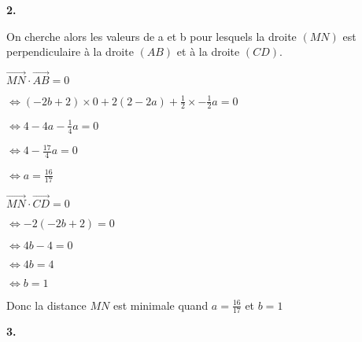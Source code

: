 \documentclass{article}
\begin{document}
\vspace{6mm}

\textbf{2.}

\vspace{2mm}

\noindent On cherche alors les valeurs de a et b pour lesquels la droite $(MN)$ est perpendiculaire à la droite $(AB)$ et à la droite $(CD)$.

\vspace{2mm}

$\overrightarrow{MN} \cdot \overrightarrow{AB} = 0$

\vspace{2mm}

$\Leftrightarrow (-2b+2)\times 0 + 2(2-2a) + \displaystyle\frac{1}{2} \times -\frac{1}{2} a = 0$

\vspace{2mm}

$\Leftrightarrow 4 - 4a - \displaystyle\frac{1}{4} a = 0$

\vspace{2mm}

$\Leftrightarrow 4 - \displaystyle\frac{17}{4}a = 0$

\vspace{2mm}

$\Leftrightarrow a = \displaystyle\frac{16}{17}$

\vspace{4mm}

$\overrightarrow{MN} \cdot \overrightarrow{CD} = 0$

\vspace{2mm}

$\Leftrightarrow -2(-2b + 2) = 0$

\vspace{2mm}

$\Leftrightarrow 4b - 4 = 0$

\vspace{2mm}

$\Leftrightarrow 4b = 4$

\vspace{2mm}

$\Leftrightarrow b = 1$

\vspace{2mm}

Donc la distance $MN$ est minimale quand $a = \frac{16}{17}$ et $b = 1$

\vspace{6mm}

\textbf{3.}
\end{document}
